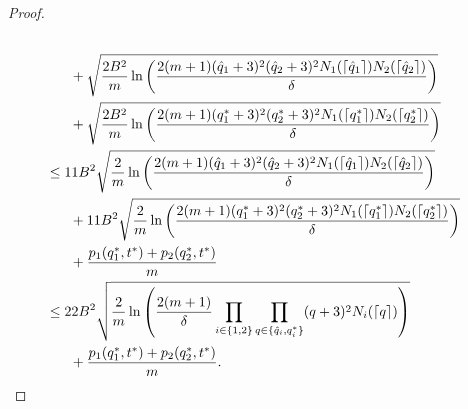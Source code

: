 \documentclass{article}
\newcommand{\pen}[0]{p}
\begin{document}
\begin{proof}
\begin{align*}
\\ & {\hskip 6mm}+ \sqrt{\frac{2B^{2}}{m}\ln\left(\frac{2 (m+1) (\hat{q}_{1}+3)^{2} (\hat{q}_{2}+3)^{2} N_{1}(\lceil \hat{q}_{1} \rceil) N_{2}(\lceil \hat{q}_{2} \rceil)}{\delta}\right)}
\\ & {\hskip 6mm}+ \sqrt{\frac{2B^{2}}{m}\ln\left(\frac{2 (m+1) (q_{1}^{*}+3)^{2} (q_{2}^{*}+3)^{2} N_{1}(\lceil q_{1}^{*} \rceil) N_{2}(\lceil q_{2}^{*} \rceil)}{\delta}\right)}
\\ & \leq 11 B^{2}\sqrt{\frac{2}{m}\ln\left(\frac{2 (m+1) (\hat{q}_{1}+3)^{2} (\hat{q}_{2}+3)^{2} N_{1}(\lceil \hat{q}_{1} \rceil) N_{2}(\lceil \hat{q}_{2} \rceil) }{\delta}\right)}
\\ & {\hskip 6mm}+ 11 B^{2} \sqrt{\frac{2}{m}\ln\left(\frac{2 (m+1) (q_{1}^{*}+3)^{2} (q_{2}^{*}+3)^{2} N_{1}(\lceil q_{1}^{*} \rceil) N_{2}(\lceil q_{2}^{*} \rceil)}{\delta}\right)}
\\ & {\hskip 6mm}+ \frac{\pen_{1}(q_{1}^{*},t^{*}) + \pen_{2}(q_{2}^{*},t^{*})}{m}
\\ & \leq 22 B^{2}\sqrt{\frac{2}{m}\ln\left(\frac{2(m+1)}{\delta} \prod_{i \in \{1,2\}} \prod_{q \in \{\hat{q}_{i},q_{i}^{*}\}} (q+3)^{2} N_{i}(\lceil q \rceil)\right)}
\\ & {\hskip 6mm}+ \frac{\pen_{1}(q_{1}^{*},t^{*}) + \pen_{2}(q_{2}^{*},t^{*})}{m}.
\end{align*}
\end{proof}
\end{document}
